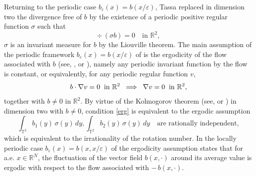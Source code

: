 \documentclass[JEP,XML,SOM,Unicode]{cedram}
\newcommand\implique{\mathchoice{\implies}{\Rightarrow}{\Rightarrow}{\Rightarrow}}
\def \RR {\mathbb R}
\def \TT {\mathbb T}
\theoremstyle{plain}
\theoremstyle{definition}
\begin{document}
Returning to the periodic case $b_\varepsilon(x)=b(x/\varepsilon)$, Tassa \cite{Tas} replaced in dimension two the divergence free of $b$ by the existence of a periodic positive regular function $\sigma$ such that
\begin{equation}\label{divb}
\div\,(\sigma b)=0\quad\mbox{in }\RR^2,
\end{equation}
\ie $\sigma$ is an invariant measure for $b$ by the Liouville theorem.
The main assumption of the periodic framework $b_\varepsilon(x)=b(x/\varepsilon)$ of \cite{Bre,HoXi,Tas} is the ergodicity of the flow associated with $b$ (see, \eg \cite[Lect.\,1]{Sin}, or \cite[Chap.\,II, \S\,5]{ReSi}), namely any periodic invariant function by the flow is constant, or equivalently, for any periodic regular function $v$,
\begin{equation}\label{erg}
b\cdot\nabla v=0\;\;\mbox{in }\RR^2\;\implique\;\nabla v=0\;\;\mbox{in }\RR^2,
\end{equation}
together with $b\neq 0$ in $\RR^2$. By virtue of the Kolmogorov theorem (see, \eg \cite[Lect.\,11]{Sin} or \cite[\S 2]{Tas}) in dimension two with $b\neq 0$, condition \eqref{erg} is equivalent to the ergodic assumption
\begin{equation}\label{birr}
\int_{\TT^2}b_1(y)\,\sigma(y)\,dy,\int_{\TT^2}b_2(y)\,\sigma(y)\,dy\quad\mbox{are rationally independent},
\end{equation}
which is equivalent to the irrationality of the rotation number.
In the locally periodic case $b_\varepsilon(x)=b(x,x/\varepsilon)$ of \cite[\S 8]{Gol1} the ergodicity assumption states that for a.e. $x\in\RR^N$, the fluctuation of the vector field $b(x,\cdot)$ around its average value is ergodic with respect to the flow associated with $-\,b(x,\cdot)$.
\end{document}
